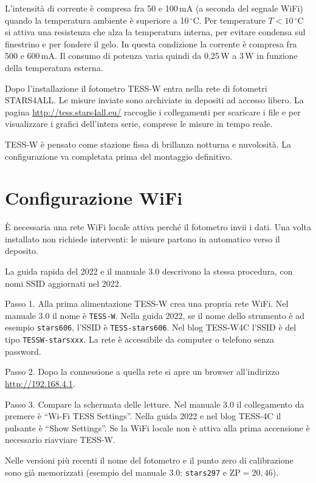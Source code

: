 \documentclass[11pt,a4paper]{report}
\begin{document}
L'intensità di corrente è compresa fra 50 e 100\,mA (a seconda del segnale WiFi) quando la temperatura ambiente è superiore a 10\,$^\circ$C. Per temperature $T < 10\,^\circ$C si attiva una resistenza che alza la temperatura interna, per evitare condensa sul finestrino e per fondere il gelo. In questa condizione la corrente è compresa fra 500 e 600\,mA. Il consumo di potenza varia quindi da 0,25\,W a 3\,W in funzione della temperatura esterna.

Dopo l'installazione il fotometro TESS-W entra nella rete di fotometri STARS4ALL. Le misure inviate sono archiviate in depositi ad accesso libero. La pagina \url{http://tess.stars4all.eu/} raccoglie i collegamenti per scaricare i file e per visualizzare i grafici dell'intera serie, comprese le misure in tempo reale.

TESS-W è pensato come stazione fissa di brillanza notturna e nuvolosità. La configurazione va completata prima del montaggio definitivo.

\section{Configurazione WiFi}

È necessaria una rete WiFi locale attiva perché il fotometro invii i dati. Una volta installato non richiede interventi: le misure partono in automatico verso il deposito.

La guida rapida del 2022 e il manuale 3.0 descrivono la stessa procedura, con nomi SSID aggiornati nel 2022.

Passo 1. Alla prima alimentazione TESS-W crea una propria rete WiFi. Nel manuale 3.0 il nome è \texttt{TESS-W}. Nella guida 2022, se il nome dello strumento è ad esempio \texttt{stars606}, l'SSID è \texttt{TESS-stars606}. Nel blog TESS-W4C l'SSID è del tipo \texttt{TESSW-starsxxx}. La rete è accessibile da computer o telefono senza password.

Passo 2. Dopo la connessione a quella rete si apre un browser all'indirizzo \url{http://192.168.4.1}.

Passo 3. Compare la schermata delle letture. Nel manuale 3.0 il collegamento da premere è ``Wi-Fi TESS Settings''. Nella guida 2022 e nel blog TESS-4C il pulsante è ``Show Settings''. Se la WiFi locale non è attiva alla prima accensione è necessario riavviare TESS-W.

Nelle versioni più recenti il nome del fotometro e il punto zero di calibrazione sono già memorizzati (esempio del manuale 3.0: \texttt{stars297} e $\mathrm{ZP}=20{,}46$).
\end{document}
